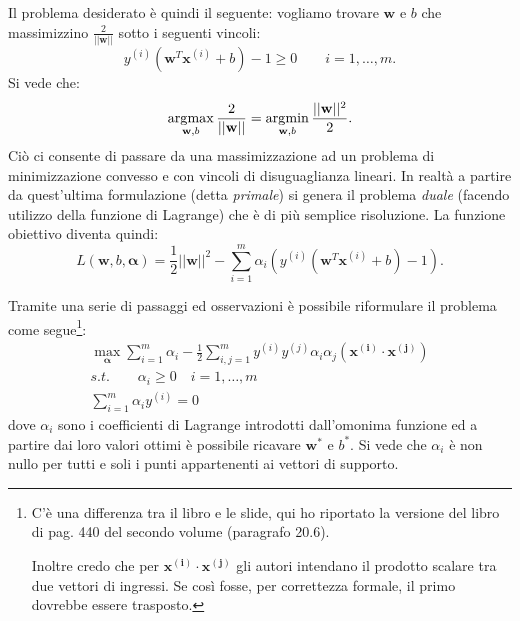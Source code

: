 Il problema desiderato è quindi il seguente: vogliamo trovare $\mathbf{w}$ e $b$ che massimizzino $\frac{2}{||\mathbf{w}||}$ sotto i seguenti vincoli:
\begin{equation*}
y^{(i)}\left(\mathbf{w}^T \mathbf{x}^{(i)} + b\right) -1 \geq 0 \qquad i=1, \dots, m.
\end{equation*}
Si vede che:
\begin{equation*}
\operatorname*{arg\!\max}_{\mathbf{w},b}{\frac{2}{||\mathbf{w}||}} = \operatorname*{arg\!\min}_{\mathbf{w},b}{\frac{||\mathbf{w}||^2}{2}}.
\end{equation*}
Ciò ci consente di passare da una massimizzazione ad un problema di minimizzazione convesso e con vincoli di disuguaglianza lineari. In realtà a partire da quest'ultima formulazione (detta \emph{primale}) si genera il problema \emph{duale} (facendo utilizzo della funzione di Lagrange) che è di più semplice risoluzione. La funzione obiettivo diventa quindi:
\begin{equation*}
L(\mathbf{w}, b, \boldsymbol\alpha) = \frac{1}{2} ||\mathbf{w}||^2 - \sum_{i=1}^m \alpha_i ( y^{(i)} (\mathbf{w}^T \mathbf{x}^{(i)} + b)-1 ).
\end{equation*}


 Tramite una serie di passaggi ed osservazioni è possibile riformulare il problema come segue\footnote{C'è una differenza tra il libro e le slide, qui ho riportato la versione del libro di pag. 440 del secondo volume (paragrafo 20.6).
 
 Inoltre credo che per $\mathbf{x^{(i)}}\cdot\mathbf{ x^{(j)}}$ gli autori intendano il prodotto scalare tra due vettori di ingressi. Se così fosse, per correttezza formale,  il primo dovrebbe essere trasposto.}:
\begin{gather*}
\max_{\boldsymbol\alpha} \sum_{i=1}^m \alpha_i - \frac{1}{2} \sum_{i,j=1}^m y^{(i)} y^{(j)} \alpha_i \alpha_j (\mathbf{x^{(i)}}\cdot\mathbf{ x^{(j)}} )\\
s.t. \qquad \alpha_i \geq 0 \quad i=1,\dots,m \\
\sum_{i=1}^m \alpha_i y^{(i)} = 0
\end{gather*}
dove $\alpha_i$ sono i coefficienti di Lagrange introdotti dall'omonima funzione ed a partire dai loro valori ottimi è possibile ricavare $\mathbf{w}^*$ e $b^*$. Si vede che $\alpha_i$ è non nullo per tutti e soli i punti appartenenti ai vettori di supporto.

